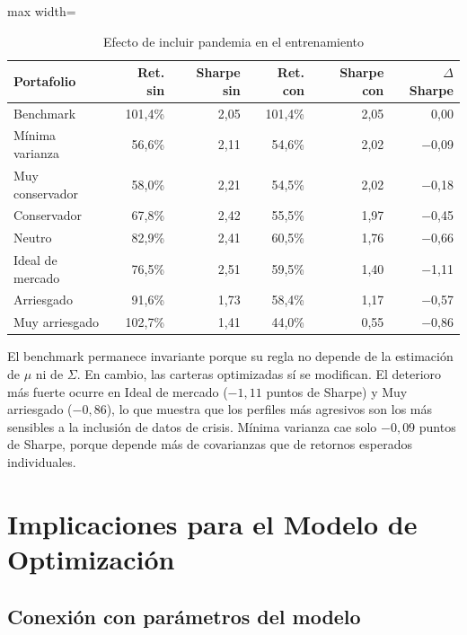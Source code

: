 \begin{table}[H]
  \centering
  \caption{Efecto de incluir pandemia en el entrenamiento}
  \label{tab:anexo2_resultados_pandemia}
  \small
  \begin{adjustbox}{max width=\textwidth}
  \begin{tabular}{lrrrrr}
    \toprule
    \textbf{Portafolio} & \textbf{Ret. sin} & \textbf{Sharpe sin}
    & \textbf{Ret. con} & \textbf{Sharpe con} & \textbf{$\Delta$ Sharpe} \\
    \midrule
    Benchmark & 101,4\% & 2,05 & 101,4\% & 2,05 & 0,00 \\
    Mínima varianza & 56,6\% & 2,11 & 54,6\% & 2,02 & $-$0,09 \\
    Muy conservador & 58,0\% & 2,21 & 54,5\% & 2,02 & $-$0,18 \\
    Conservador & 67,8\% & 2,42 & 55,5\% & 1,97 & $-$0,45 \\
    Neutro & 82,9\% & 2,41 & 60,5\% & 1,76 & $-$0,66 \\
    Ideal de mercado & 76,5\% & 2,51 & 59,5\% & 1,40 & $-$1,11 \\
    Arriesgado & 91,6\% & 1,73 & 58,4\% & 1,17 & $-$0,57 \\
    Muy arriesgado & 102,7\% & 1,41 & 44,0\% & 0,55 & $-$0,86 \\
    \bottomrule
  \end{tabular}
  \end{adjustbox}
\end{table}

El benchmark permanece invariante porque su regla no depende de la estimación
de $\mu$ ni de $\Sigma$. En cambio, las carteras optimizadas sí se modifican.
El deterioro más fuerte ocurre en Ideal de mercado ($-1,11$ puntos de Sharpe)
y Muy arriesgado ($-0,86$), lo que muestra que los perfiles más agresivos son
los más sensibles a la inclusión de datos de crisis. Mínima varianza cae solo
$-0,09$ puntos de Sharpe, porque depende más de covarianzas que de retornos
esperados individuales.

\section*{Implicaciones para el Modelo de Optimización}

\subsection*{Conexión con parámetros del modelo}

